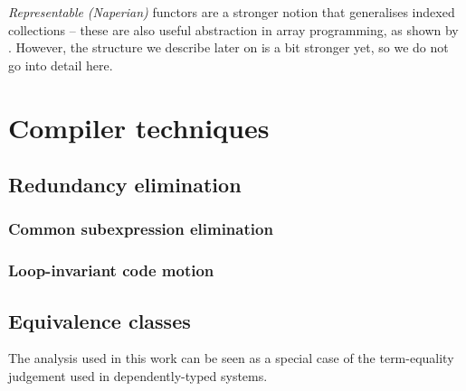 \textit{Representable} \textit{(Naperian)} functors are a stronger notion that generalises indexed collections -- these are also useful abstraction in array programming, as shown by \textcite{gibbons2016aplicative}. However, the structure we describe later on is a bit stronger yet, so we do not go into detail here.



\section{Compiler techniques}

\subsection{Redundancy elimination}

\subsubsection{Common subexpression elimination}

\subsubsection{Loop-invariant code motion}

\subsection{Equivalence classes}

The analysis used in this work can be seen as a special case of the term-equality judgement used in dependently-typed systems.

